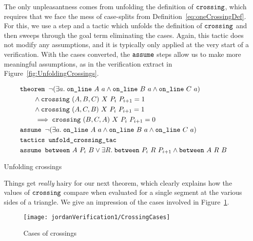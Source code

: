 The only unpleasantness comes from unfolding the definition of $\texttt{crossing}$, which requires that we face the mess of case-splits from Definition~\ref{eq:oneCrossingDef}. For this, we use a  step and a tactic  which unfolds the definition of $\texttt{crossing}$ and then sweeps through the goal term eliminating the cases. Again, this tactic does not modify any assumptions, and it is typically only applied at the very start of a verification. With the cases converted, the $\texttt{assume}$ steps allow us to make more meaningful assumptions, as in the verification extract in Figure~\ref{fig:UnfoldingCrossings}.

\begin{boxedfigure}
\small
\begin{align*}
&\texttt{theorem } \neg(\exists a.\; \texttt{on\_line}\ A\ a\wedge \texttt{on\_line}\ B\ a\wedge \texttt{on\_line}\ C\ a) &\\
&\qquad\wedge \texttt{crossing}\ (A,B,C)\ X\ P_i\ P_{i+1} = 1&\\
&\qquad\wedge \texttt{crossing}\ (A,C,B)\ X\ P_i\ P_{i+1} = 1&\\
&\qquad\implies \texttt{crossing}\ (B,C,A)\ X\ P_i\ P_{i+1} = 0&\\
&\texttt{assume } \neg(\exists a.\; \texttt{on\_line}\ A\ a\wedge \texttt{on\_line}\ B\ a\wedge \texttt{on\_line}\ C\ a)&\\
&\texttt{tactics } \texttt{unfold\_crossing\_tac}&\\
&\texttt{assume } \texttt{between}\ A\ P_i\ B \vee \exists R.\; \texttt{between}\ P_i\ R\ P_{i+1} \wedge \texttt{between}\ A\ R\ B
\end{align*}
\caption{Unfolding crossings}
\label{fig:UnfoldingCrossings}
\end{boxedfigure}

Things get \emph{really} hairy for our next theorem, which clearly explains how the values of $\texttt{crossing}$ compare when evaluated for a single segment at the various sides of a triangle. We give an impression of the cases involved in Figure~\ref{fig:CrossingCases}.

\begin{figure}
\centering\texttt{[image: jordanVerification1/CrossingCases]}
\caption{Cases of crossings}
\label{fig:CrossingCases}
\end{figure}

